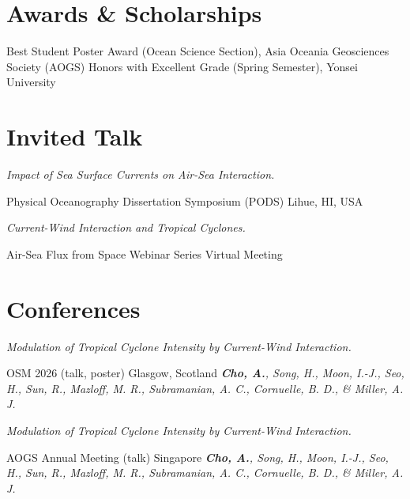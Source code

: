\documentclass[11pt,usletter,sans]{moderncv}
\begin{document}
\section{Awards \& Scholarships}
       {Best Student Poster Award (Ocean Science Section), 
       Asia Oceania Geosciences Society (AOGS)}
       {Honors with Excellent Grade (Spring Semester), Yonsei University}

\section{Invited Talk}
        {\parbox[t]{0.8\textwidth}{\textit{Impact of Sea Surface Currents on Air-Sea Interaction.}}}
        {Physical Oceanography Dissertation Symposium (PODS)}      %
        {Lihue, HI, USA}             %
        {}                           %
        {}                           %
\vspace{0.5em}    
        {\parbox[t]{0.8\textwidth}{\textit{Current-Wind Interaction and Tropical Cyclones.}}}
        {Air-Sea Flux from Space Webinar Series}      %
        {Virtual Meeting}             %
        {}                           %
        {}                           %

\section{Conferences}
        {\parbox[t]{0.8\textwidth}{\textit{Modulation of Tropical Cyclone Intensity by Current-Wind Interaction.}}}
        {OSM 2026 (talk, poster)}   %
        {Glasgow, Scotland}           %
        {}
        {}
        {\emph{\textbf{Cho, A.}, Song, H., Moon, I.-J., Seo, H., Sun, R., Mazloff, M. R., 
Subramanian, A. C., Cornuelle, B. D., \& Miller, A. J.}}
        
\vspace{0.8em}

        {\parbox[t]{0.8\textwidth}{\textit{Modulation of Tropical Cyclone Intensity by Current-Wind Interaction.}}}
        {AOGS Annual Meeting (talk)}   %
        {Singapore}           %
        {}
        {}
        {\emph{\textbf{Cho, A.}, Song, H., Moon, I.-J., Seo, H., Sun, R., Mazloff, M. R., 
Subramanian, A. C., Cornuelle, B. D., \& Miller, A. J.}}
        
\end{document}
